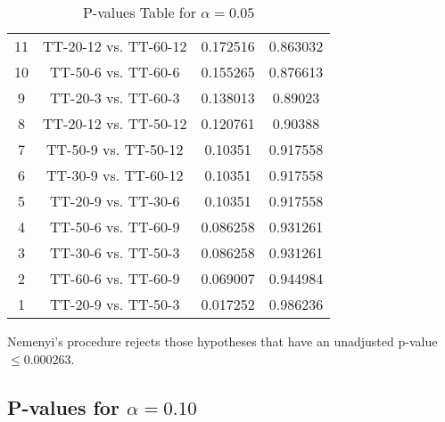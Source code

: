 \documentclass[a4paper,10pt]{article}
\begin{document}
\begin{landscape}
\begin{table}[!htp]
\begin{tabular}{cccc}
11&TT-20-12 vs. TT-60-12&0.172516&0.863032\\
10&TT-50-6 vs. TT-60-6&0.155265&0.876613\\
9&TT-20-3 vs. TT-60-3&0.138013&0.89023\\
8&TT-20-12 vs. TT-50-12&0.120761&0.90388\\
7&TT-50-9 vs. TT-50-12&0.10351&0.917558\\
6&TT-30-9 vs. TT-60-12&0.10351&0.917558\\
5&TT-20-9 vs. TT-30-6&0.10351&0.917558\\
4&TT-50-6 vs. TT-60-9&0.086258&0.931261\\
3&TT-30-6 vs. TT-50-3&0.086258&0.931261\\
2&TT-60-6 vs. TT-60-9&0.069007&0.944984\\
1&TT-20-9 vs. TT-50-3&0.017252&0.986236\\
\hline
\end{tabular}
\caption{P-values Table for $\alpha=0.05$}
\end{table}Nemenyi's procedure rejects those hypotheses that have an unadjusted p-value $\le0.000263$.

\pagebreak

\subsection{P-values for $\alpha=0.10$}


\end{landscape}
\end{document}
